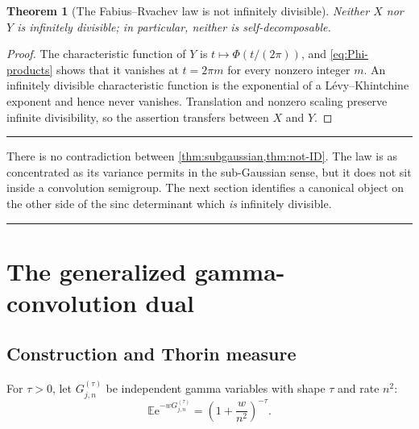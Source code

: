 \documentclass[11pt,oneside]{article}
\newtheorem{theorem}{Theorem}[section]
\theoremstyle{definition}
\theoremstyle{remark}
\newcommand{\e}{\mathrm e}
\newcommand{\E}{\mathbb E}
\newenvironment{boxedremark}{%
  \par\smallskip\noindent\begin{center}\begin{minipage}{0.94\textwidth}%
  \color{black}\hrule\vspace{0.6em}\small
}{%
  \vspace{0.6em}\hrule\end{minipage}\end{center}\smallskip
}
\begin{document}
\begin{theorem}[The Fabius--Rvachev law is not infinitely divisible]
\label{thm:not-ID}
Neither $X$ nor $Y$ is infinitely divisible; in particular, neither is
self-decomposable.
\end{theorem}

\begin{proof}
The characteristic function of $Y$ is
$t\mapsto\Phi(t/(2\pi))$, and \cref{eq:Phi-products} shows that it vanishes at
$t=2\pi m$ for every nonzero integer $m$.  An infinitely divisible
characteristic function is the exponential of a L\'evy--Khintchine exponent
and hence never vanishes.  Translation and nonzero scaling preserve infinite
divisibility, so the assertion transfers between $X$ and $Y$.
\end{proof}

\begin{boxedremark}
There is no contradiction between \cref{thm:subgaussian,thm:not-ID}.  The law
is as concentrated as its variance permits in the sub-Gaussian sense, but it
does not sit inside a convolution semigroup.  The next section identifies a
canonical object on the other side of the sinc determinant which \emph{is}
infinitely divisible.
\end{boxedremark}

\section{The generalized gamma-convolution dual}

\subsection{Construction and Thorin measure}

For $\tau>0$, let $G_{j,n}^{(\tau)}$ be independent gamma variables with shape
$\tau$ and rate $n^2$:
\begin{equation}\label{eq:gamma-LT}
 \E\e^{-wG_{j,n}^{(\tau)}}=\left(1+\frac{w}{n^2}\right)^{-\tau}.
\end{equation}
\end{document}
